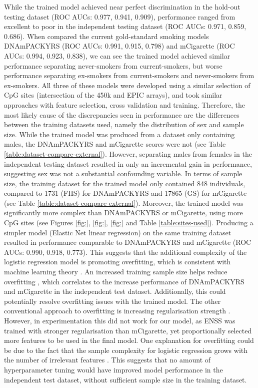 \documentclass[draft]{article}
\begin{document}
While the trained model achieved near perfect discrimination in the hold-out testing dataset (ROC AUCs: 0.977, 0.941, 0.909), performance ranged from excellent to poor in the independent testing dataset (ROC AUCs: 0.971, 0.859, 0.686). When compared the current gold-standard smoking models DNAmPACKYRS (ROC AUCs: 0.991, 0.915, 0.798) and mCigarette (ROC AUCs: 0.994, 0.923, 0.838), we can see the trained model achieved similar performance separating never-smokers from current-smokers, but worse performance separating ex-smokers from current-smokers and never-smokers from ex-smokers. All three of these models were developed using a similar selection of CpG sites (intersection of the 450k and EPIC arrays), and took similar approaches with feature selection, cross validation and training. Therefore, the most likely cause of the discrepancies seen in performance are the differences between the training datasets used, namely the distribution of sex and sample size. While the trained model was produced from a dataset only containing males, the DNAmPACKYRS and mCigarette scores were not (see Table \ref{table:dataset-compare-external}). However, separating males from females in the independent testing dataset resulted in only an incremental gain in performance, suggesting sex was not a substantial confounding variable. In terms of sample size, the training dataset for the trained model only contained 848 individuals, compared to \num{1731} (FHS) for DNAmPACKYRS and \num{17865} (GS) for mCigarette (see Table \ref{table:dataset-compare-external}). Moreover, the trained model was significantly more complex than DNAmPACKYRS or mCigarette, using more CpG sites (see Figures \ref{fig:}, \ref{fig:}, \ref{fig:} and Table \ref{table:sites-used}). Producing a simpler model (Elastic Net linear regression) on the same training dataset resulted in performance comparable to DNAmPACKYRS and mCigarette (ROC AUCs: 0.990, 0.918, 0.773). This suggests that the additional complexity of the logistic regression model is promoting overfitting, which is consistent with machine learning theory \cite{bishop2006pattern}. An increased training sample size helps reduce overfitting \cite{bishop2006pattern}, which correlates to the increase performance of DNAmPACKYRS and mCigarette in the independent test dataset. Additionally, this could potentially resolve overfitting issues with the trained model. The other conventional approach to overfitting is increasing regularisation strength \cite{buhlmann2011statistics}. However, in experimentation this did not work for our model, as ENSS was trained with stronger regularisation than mCigarette, yet proportionally selected more features to be used in the final model. One explanation for  overfitting could be due to the fact that the sample complexity for logistic regression grows with the number of irrelevant features \cite{ng2004feature}. This suggests that no amount of hyperparameter tuning would have improved model performance in the independent test dataset, without sufficient sample size in the training dataset.
\end{document}
